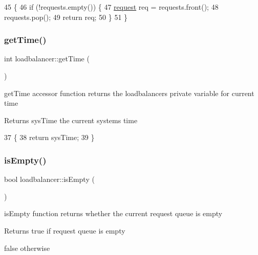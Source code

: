 \begin{DoxyCode}
45                                  \{
46     \textcolor{keywordflow}{if} (!requests.empty()) \{
47         \hyperlink{structrequest}{request} req = requests.front();
48         requests.pop();
49         \textcolor{keywordflow}{return} req;
50     \}
51 \}
\end{DoxyCode}
\mbox{\label{classloadbalancer_afc308893c7ab0fc8b92036deae7a2de9}} 
\subsubsection{\texorpdfstring{get\+Time()}{getTime()}}
{\footnotesize\ttfamily int loadbalancer\+::get\+Time (\begin{DoxyParamCaption}{ }\end{DoxyParamCaption})}

get\+Time accessor function returns the loadbalancer\textquotesingle{}s private variable for current time \begin{DoxyReturn}{Returns}
sys\+Time the current system\textquotesingle{}s time 
\end{DoxyReturn}

\begin{DoxyCode}
37                           \{
38     \textcolor{keywordflow}{return} sysTime;
39 \}
\end{DoxyCode}
\mbox{\label{classloadbalancer_a542b0b5b5759c074e3e8d1cbf1f33b52}} 
\subsubsection{\texorpdfstring{is\+Empty()}{isEmpty()}}
{\footnotesize\ttfamily bool loadbalancer\+::is\+Empty (\begin{DoxyParamCaption}{ }\end{DoxyParamCaption})}

is\+Empty function returns whether the current request queue is empty \begin{DoxyReturn}{Returns}
true if request queue is empty 

false otherwise 
\end{DoxyReturn}

